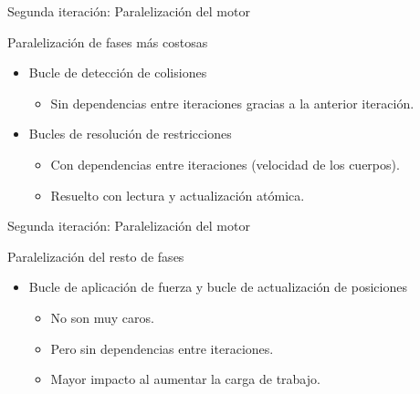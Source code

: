 \documentclass[10pt,xcolor=table]{beamer}
\begin{document}
\begin{frame}{Segunda iteración: Paralelización del motor}
  \begin{block}{Paralelización de fases más costosas}
  \begin{itemize}
    \item Bucle de detección de colisiones
    \begin{itemize}
      \item Sin dependencias entre iteraciones gracias a la anterior iteración.
    \end{itemize}
    \item Bucles de resolución de restricciones
    \begin{itemize}
      \item Con dependencias entre iteraciones (velocidad de los cuerpos).
      \item Resuelto con lectura y actualización atómica.
    \end{itemize}
  \end{itemize}
  \end{block}
\end{frame}

\begin{frame}{Segunda iteración: Paralelización del motor}
  \begin{block}{Paralelización del resto de fases}
    \begin{itemize}
    \item Bucle de aplicación de fuerza y bucle de actualización de posiciones
    \begin{itemize}
      \item No son muy caros.
      \item Pero sin dependencias entre iteraciones.
      \item Mayor impacto al aumentar la carga de trabajo.
    \end{itemize}
  \end{itemize}
  \end{block}
\end{frame}
\end{document}
